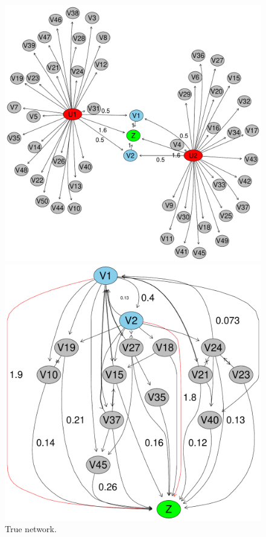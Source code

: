 \documentclass{article}
\begin{document}
\begin{figure}[h!]
  \centering
  \begin{minipage}[t]{0.3\linewidth}
    \includegraphics[width=\linewidth]{./images/true_network.pdf}
    \caption{\label{fig_truenet}True network. }
  \end{minipage}\hfill
   \begin{minipage}[t]{0.3\linewidth}
     \includegraphics[width=\linewidth]{./images/estimated_network_missingdata.pdf}

\end{minipage}
\end{figure}
\end{document}
